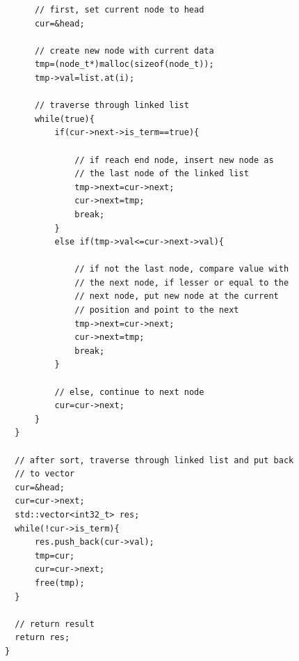 \documentclass[12pt,a4paper]{report}
\begin{document}
\begin{lstlisting}
      // first, set current node to head
      cur=&head;

      // create new node with current data
      tmp=(node_t*)malloc(sizeof(node_t));
      tmp->val=list.at(i);

      // traverse through linked list
      while(true){
          if(cur->next->is_term==true){

              // if reach end node, insert new node as
              // the last node of the linked list
              tmp->next=cur->next;
              cur->next=tmp;
              break;
          }
          else if(tmp->val<=cur->next->val){

              // if not the last node, compare value with
              // the next node, if lesser or equal to the 
              // next node, put new node at the current 
              // position and point to the next
              tmp->next=cur->next;
              cur->next=tmp;
              break;
          }

          // else, continue to next node
          cur=cur->next;
      }
  }

  // after sort, traverse through linked list and put back 
  // to vector
  cur=&head;
  cur=cur->next;
  std::vector<int32_t> res;
  while(!cur->is_term){
      res.push_back(cur->val);
      tmp=cur;
      cur=cur->next;
      free(tmp);
  }

  // return result
  return res;
}
\end{lstlisting}
\end{document}
